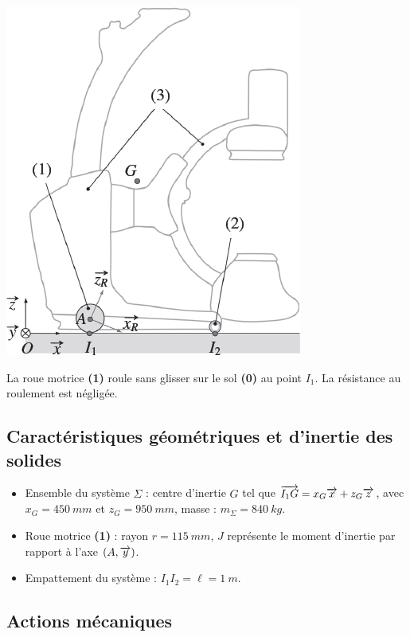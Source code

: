 \documentclass[10pt,fleqn]{article} %
\begin{document}
\begin{multicols}{2}
\begin{center}
\includegraphics[width=.8\linewidth]{images/fig_04}
\end{center}



\begin{hypo}
La roue motrice \textbf{(1)} roule sans glisser sur le sol \textbf{(0)} au point $I_1$.
La résistance au roulement est négligée.
\end{hypo}

\subsection*{Caractéristiques géométriques et d’inertie des solides}
\begin{itemize}
\item Ensemble du système $\Sigma$ : centre d’inertie $G$ tel que $\overrightarrow{I_1G} = x_G \overrightarrow{x} +z_G \overrightarrow{z}$, avec $x_G=\SI{450}{mm}$ et $z_G=\SI{950}{mm}$, masse : $m_{\Sigma}=\SI{840}{kg}$.
\item Roue motrice \textbf{(1)} : rayon $r = \SI{115}{mm}$, $J$ représente le moment d’inertie par rapport à l’axe $\left(A,\overrightarrow{y}\right)$.
\item Empattement du système : $I_1I_2 =\ell  = \SI{1}{m}$.
\end{itemize}

\subsection*{Actions mécaniques}


\end{multicols}
\end{document}
